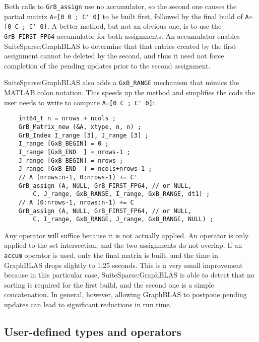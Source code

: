 \documentclass[12pt]{article}
\begin{document}
Both calls to \verb'GrB_assign' use no accumulator, so the second one
causes the partial matrix \verb"A=[0 0 ; C' 0]" to be built first, followed by
the final build of \verb"A=[0 C ; C' 0]".  A better method, but not an obvious
one, is to use the \verb'GrB_FIRST_FP64' accumulator for both assignments.  An
accumulator enables SuiteSparse:GraphBLAS to determine that that entries
created by the first assignment cannot be deleted by the second, and thus it
need not force completion of the pending updates prior to the second
assignment.

SuiteSparse:GraphBLAS also adds a \verb'GxB_RANGE' mechanism that mimics
the MATLAB colon notation.  This speeds up the method and simplifies the
code the user needs to write to compute \verb"A=[0 C ; C' 0]":

    \vspace{-0.05in}
    {\footnotesize
    \begin{verbatim}
    int64_t n = nrows + ncols ;
    GrB_Matrix_new (&A, xtype, n, n) ;
    GrB_Index I_range [3], J_range [3] ;
    I_range [GxB_BEGIN] = 0 ;
    I_range [GxB_END  ] = nrows-1 ;
    J_range [GxB_BEGIN] = nrows ;
    J_range [GxB_END  ] = ncols+nrows-1 ;
    // A (nrows:n-1, 0:nrows-1) += C'
    GrB_assign (A, NULL, GrB_FIRST_FP64, // or NULL,
        C, J_range, GxB_RANGE, I_range, GxB_RANGE, dt1) ;
    // A (0:nrows-1, nrows:n-1) += C
    GrB_assign (A, NULL, GrB_FIRST_FP64, // or NULL,
        C, I_range, GxB_RANGE, J_range, GxB_RANGE, NULL) ; \end{verbatim}}

Any operator will suffice because it is not actually applied.  An operator is
only applied to the set intersection, and the two assignments do not overlap.
If an \verb'accum' operator is used, only the final matrix is built, and the
time in GraphBLAS drops slightly to 1.25 seconds.  This is a very small
improvement because in this particular case, SuiteSparse:GraphBLAS is able to
detect that no sorting is required for the first build, and the second one is a
simple concatenation.  In general, however, allowing GraphBLAS to postpone
pending updates can lead to significant reductions in run time.

\subsection{User-defined types and operators}
\label{user}
\end{document}
